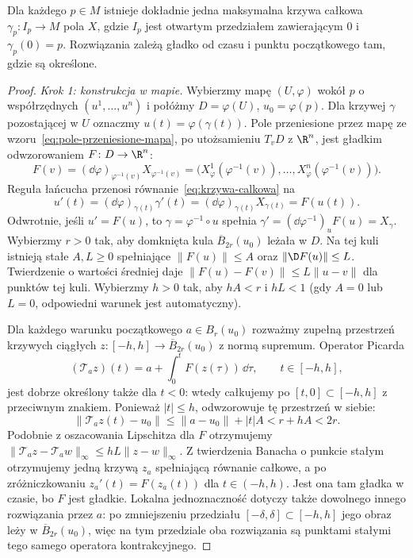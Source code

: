 \begin{twierdzenie}
\label{thm:ode}
Dla każdego $p\in M$ istnieje dokładnie jedna maksymalna krzywa
całkowa $\gamma_p\colon I_p\to M$ pola $X$, gdzie $I_p$ jest otwartym
przedziałem zawierającym $0$ i $\gamma_p(0)=p$.
Rozwiązania zależą gładko od czasu i punktu początkowego tam,
gdzie są określone.
\end{twierdzenie}
\begin{proof}
\emph{Krok 1: konstrukcja w mapie.}
Wybierzmy mapę $(U,\varphi)$ wokół $p$ o współrzędnych
$(u^1,\ldots,u^n)$ i połóżmy $D=\varphi(U)$, $u_0=\varphi(p)$.
Dla krzywej $\gamma$ pozostającej w $U$ oznaczmy
$u(t)=\varphi(\gamma(t))$. Pole przeniesione przez mapę
ze wzoru~\eqref{eq:pole-przeniesione-mapa}, po utożsamieniu
$T_vD$ z $\R^n$, jest gładkim odwzorowaniem $F\colon D\to\R^n$:
\[
 F(v)=(\dd\varphi)_{\varphi^{-1}(v)}X_{\varphi^{-1}(v)}
     =\bigl(X_\varphi^1(\varphi^{-1}(v)),\ldots,
             X_\varphi^n(\varphi^{-1}(v))\bigr).
\]
Reguła łańcucha przenosi równanie~\eqref{eq:krzywa-calkowa} na
\[
 u'(t)=(\dd\varphi)_{\gamma(t)}\gamma'(t)
      =(\dd\varphi)_{\gamma(t)}X_{\gamma(t)}=F(u(t)).
\]
Odwrotnie, jeśli $u'=F(u)$, to $\gamma=\varphi^{-1}\circ u$
spełnia $\gamma'=(\dd\varphi^{-1})_uF(u)=X_\gamma$.
Wybierzmy $r>0$ tak, aby domknięta kula
$\overline B_{2r}(u_0)$ leżała w $D$.
Na tej kuli istnieją stałe $A,L\geq 0$ spełniające
$\|F(u)\|\leq A$ oraz $\|\D F(u)\|\leq L$.
Twierdzenie o wartości średniej daje
$\|F(u)-F(v)\|\leq L\|u-v\|$ dla punktów tej kuli.
Wybierzmy $h>0$ tak, aby $hA<r$ i $hL<1$
(gdy $A=0$ lub $L=0$, odpowiedni warunek jest automatyczny).

Dla każdego warunku początkowego $a\in B_r(u_0)$ rozważmy
zupełną przestrzeń krzywych ciągłych
$z\colon[-h,h]\to\overline B_{2r}(u_0)$ z normą supremum.
Operator Picarda
\[
 (\mathcal T_a z)(t)=a+\int_0^t F(z(\tau))\,\dd\tau,
 \qquad t\in[-h,h],
\]
jest dobrze określony także dla $t<0$: wtedy całkujemy po
$[t,0]\subset[-h,h]$ z przeciwnym znakiem. Ponieważ $|t|\leq h$,
odwzorowuje tę przestrzeń w siebie:
\[
 \|\mathcal T_a z(t)-u_0\|
 \leq\|a-u_0\|+|t|A<r+hA<2r.
\]
Podobnie z oszacowania Lipschitza dla $F$ otrzymujemy
$\|\mathcal T_a z-\mathcal T_a w\|_\infty
 \leq hL\|z-w\|_\infty$.
Z twierdzenia Banacha o punkcie stałym otrzymujemy jedną
krzywą $z_a$ spełniającą równanie całkowe, a po zróżniczkowaniu
$z_a'(t)=F(z_a(t))$ dla $t\in(-h,h)$. Jest ona tam gładka
w czasie, bo $F$ jest gładkie. Lokalna jednoznaczność dotyczy
także dowolnego innego rozwiązania przez $a$: po zmniejszeniu
przedziału $[-\delta,\delta]\subset[-h,h]$ jego obraz leży w
$\overline B_{2r}(u_0)$, więc na tym przedziale oba rozwiązania
są punktami stałymi tego samego operatora kontrakcyjnego.


\end{proof}
